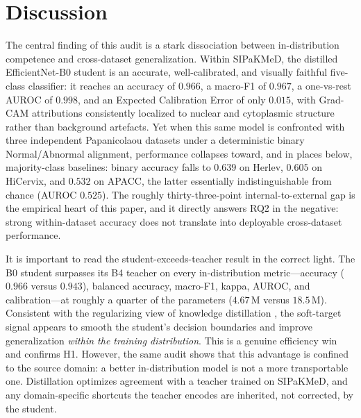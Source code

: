 \section{Discussion}

The central finding of this audit is a stark dissociation between in-distribution competence and cross-dataset generalization. Within SIPaKMeD, the distilled EfficientNet-B0 student is an accurate, well-calibrated, and visually faithful five-class classifier: it reaches an accuracy of $0.966$, a macro-F1 of $0.967$, a one-vs-rest AUROC of $0.998$, and an Expected Calibration Error of only $0.015$, with Grad-CAM attributions consistently localized to nuclear and cytoplasmic structure rather than background artefacts. Yet when this same model is confronted with three independent Papanicolaou datasets under a deterministic binary Normal/Abnormal alignment, performance collapses toward, and in places below, majority-class baselines: binary accuracy falls to $0.639$ on Herlev, $0.605$ on HiCervix, and $0.532$ on APACC, the latter essentially indistinguishable from chance (AUROC $0.525$). The roughly thirty-three-point internal-to-external gap is the empirical heart of this paper, and it directly answers RQ2 in the negative: strong within-dataset accuracy does not translate into deployable cross-dataset performance.

It is important to read the student-exceeds-teacher result in the correct light. The B0 student surpasses its B4 teacher on every in-distribution metric---accuracy ($0.966$ versus $0.943$), balanced accuracy, macro-F1, kappa, AUROC, and calibration---at roughly a quarter of the parameters ($4.67$\,M versus $18.5$\,M). Consistent with the regularizing view of knowledge distillation \citep{hinton2015distilling}, the soft-target signal appears to smooth the student's decision boundaries and improve generalization \emph{within the training distribution}. This is a genuine efficiency win and confirms H1. However, the same audit shows that this advantage is confined to the source domain: a better in-distribution model is not a more transportable one. Distillation optimizes agreement with a teacher trained on SIPaKMeD, and any domain-specific shortcuts \citep{geirhos2020shortcut} the teacher encodes are inherited, not corrected, by the student.

